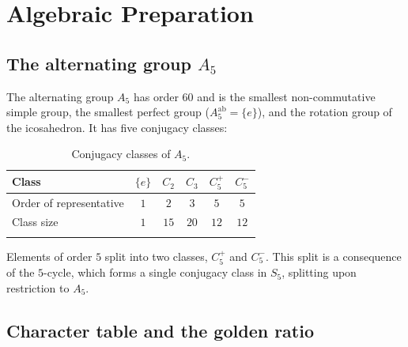 \documentclass[sn-mathphys-num,Numbered]{sn-jnl}
\theoremstyle{thmstyleone}
\theoremstyle{thmstylethree}
\theoremstyle{thmstyletwo}
\begin{document}
\section{Algebraic Preparation}
\label{sec:algebra}

\subsection{The alternating group \texorpdfstring{$A_5$}{A5}}
\label{ssec:A5}

The alternating group $A_5$ has order $60$ and is the smallest
non-commutative simple group, the smallest perfect group
($A_5^{\mathrm{ab}} = \{e\}$), and the rotation group of the
icosahedron. It has five conjugacy classes:

\begin{table}[h]
\caption{Conjugacy classes of $A_5$.}
\label{tab:conjugacy}
\begin{tabular}{@{}lccccc@{}}
\toprule
Class & $\{e\}$ & $C_2$ & $C_3$ & $C_5^+$ & $C_5^-$ \\
\midrule
Order of representative & $1$ & $2$ & $3$ & $5$ & $5$ \\
Class size              & $1$ & $15$ & $20$ & $12$ & $12$ \\
\botrule
\end{tabular}
\end{table}

Elements of order $5$ split into two classes, $C_5^+$ and $C_5^-$.
This split is a consequence of the $5$-cycle, which forms a single
conjugacy class in $S_5$, splitting upon restriction to $A_5$.

\subsection{Character table and the golden ratio}
\label{ssec:chartable}
\end{document}
